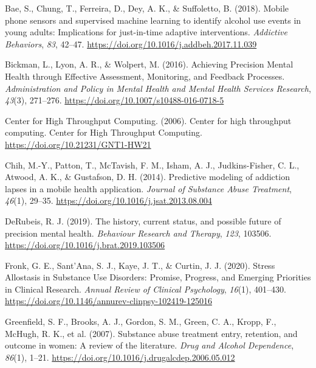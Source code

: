 \documentclass[
]{agujournal2019}
\newlength{\cslhangindent}
\newenvironment{CSLReferences}[2] %
 {\begin{list}{}{%
  \setlength{\itemindent}{0pt}
  \setlength{\leftmargin}{0pt}
  \setlength{\parsep}{0pt}
  \ifodd #1
   \setlength{\leftmargin}{\cslhangindent}
   \setlength{\itemindent}{-1\cslhangindent}
  \fi
  \setlength{\itemsep}{#2\baselineskip}}}
 {\end{list}}
\begin{document}
\label{refs}
\begin{CSLReferences}{1}{0}
\vspace{1em}

Bae, S., Chung, T., Ferreira, D., Dey, A. K., \& Suffoletto, B. (2018).
Mobile phone sensors and supervised machine learning to identify alcohol
use events in young adults: {Implications} for just-in-time adaptive
interventions. \emph{Addictive Behaviors}, \emph{83}, 42--47.
\url{https://doi.org/10.1016/j.addbeh.2017.11.039}

Bickman, L., Lyon, A. R., \& Wolpert, M. (2016). Achieving {Precision
Mental Health} through {Effective Assessment}, {Monitoring}, and
{Feedback Processes}. \emph{Administration and Policy in Mental Health
and Mental Health Services Research}, \emph{43}(3), 271--276.
\url{https://doi.org/10.1007/s10488-016-0718-5}

Center for High Throughput Computing. (2006). Center for high throughput
computing. Center for High Throughput Computing.
\url{https://doi.org/10.21231/GNT1-HW21}

Chih, M.-Y., Patton, T., McTavish, F. M., Isham, A. J., Judkins-Fisher,
C. L., Atwood, A. K., \& Gustafson, D. H. (2014). Predictive modeling of
addiction lapses in a mobile health application. \emph{Journal of
Substance Abuse Treatment}, \emph{46}(1), 29--35.
\url{https://doi.org/10.1016/j.jsat.2013.08.004}

DeRubeis, R. J. (2019). The history, current status, and possible future
of precision mental health. \emph{Behaviour Research and Therapy},
\emph{123}, 103506. \url{https://doi.org/10.1016/j.brat.2019.103506}

Fronk, G. E., Sant'Ana, S. J., Kaye, J. T., \& Curtin, J. J. (2020).
Stress {Allostasis} in {Substance Use Disorders}: {Promise}, {Progress},
and {Emerging Priorities} in {Clinical Research}. \emph{Annual Review of
Clinical Psychology}, \emph{16}(1), 401--430.
\url{https://doi.org/10.1146/annurev-clinpsy-102419-125016}

Greenfield, S. F., Brooks, A. J., Gordon, S. M., Green, C. A., Kropp,
F., McHugh, R. K., et al. (2007). Substance abuse treatment entry,
retention, and outcome in women: {A} review of the literature.
\emph{Drug and Alcohol Dependence}, \emph{86}(1), 1--21.
\url{https://doi.org/10.1016/j.drugalcdep.2006.05.012}


\end{CSLReferences}
\end{document}
